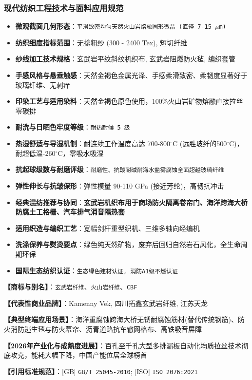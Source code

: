 \documentclass[11pt,openright,twoside,UTF8]{ctexbook}
\begin{document}
\subsubsection*{现代纺织工程技术与面料应用规范}
\begin{itemize} \setlength{\itemsep}{2pt}
    \item \textbf{微观截面几何形态}：\texttt{平滑致密均匀天然火山岩熔融圆形微晶 (直径 7-15 $\mu$m)}
    \item \textbf{纺织细度指标范围}：无捻粗纱 (300 - 2400 Tex), 短切纤维
    \item \textbf{纱线加工技术规格}：玄武岩平纹斜纹机织布, 玄武岩阻燃防火毡, 编织套管
    \item \textbf{手感风格与悬垂触感}：天然金褐色金属光泽、手感柔滑致密、柔韧度显著好于玻璃纤维、无刺痒
    \item \textbf{印染工艺与适用染料}：天然金褐色原色使用，100\%火山岩矿物熔融直接拉丝零碳排
    \item \textbf{耐洗与日晒色牢度等级}：\texttt{耐热耐候 5 级}
    \item \textbf{热湿舒适与导湿机制}：耐连续工作温度高达 700-800$^\circ\mathrm{C}$ (远胜玻纤的500$^\circ\mathrm{C}$)，耐超低温-260$^\circ\mathrm{C}$，零吸水吸湿
    \item \textbf{抗起球级数与耐磨评级}：\texttt{耐磨性、抗酸耐碱耐海水盐雾腐蚀全面超越玻璃纤维}
    \item \textbf{弹性伸长与抗皱保形}：弹性模量 90-110 GPa (接近芳纶)，高韧抗冲击
    \item \textbf{经典混纺推荐与协同}：\textbf{玄武岩机织布用于商场防火隔离卷帘门、海洋跨海大桥防腐土工格栅、汽车排气消音隔热套}
    \item \textbf{适用织造与编织工艺}：宽幅剑杆重型织机、三维多轴向经编机
    \item \textbf{洗涤保养与熨烫要点}：绿色纯天然矿物，废弃后回归自然岩石风化，全生命周期环保
    \item \textbf{国际生态纺织认证}：\texttt{生态绿色建材认证, 消防A1级不燃认证}
\end{itemize}
\vspace{0.2cm}

\noindent\textbf{【商标与别名】}：\texttt{玄武岩纤维}、\texttt{火山岩纤维}、\texttt{CBF}\par
\noindent\textbf{【代表性商业品牌】}：Kamenny Vek, 四川拓鑫玄武岩纤维, 江苏天龙\par
\noindent\textbf{【典型终端应用场景】}：海洋重腐蚀跨海大桥无锈耐腐蚀筋材(替代传统钢筋)、防火消防逃生毯与防火幕帘、沥青道路抗车辙网格布、高铁吸音屏障\par
\noindent\textbf{【2026年产业化与成熟度进展】}：百孔至千孔大型多排漏板自动化均质拉丝技术彻底攻克，能耗大幅下降，中国产能位居全球榜首\par
\noindent\textbf{【引用标准规范】}：[GB] \texttt{GB/T 25045-2010}; [ISO] \texttt{ISO 2076:2021}\par
\vspace{0.5cm}
\end{document}
